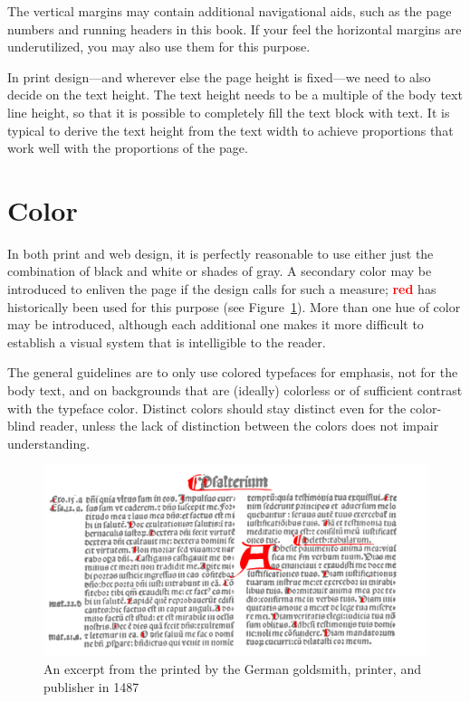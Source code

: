 The vertical margins may contain additional navigational aids, such as the page
numbers and running headers in this book. If your feel the horizontal margins
are underutilized, you may also use them for this
purpose.~\cite[sec.\,8.5.2]{bringhurst92}

In print design---and wherever else the page height is fixed---we need to also
decide on the text height. The text height needs to be a multiple of the body
text line height, so that it is possible to completely fill the text block with
text.  It is typical to derive the text height from the text width to achieve
proportions that work well with the proportions of the
page.~\cite[sec.\,8.4.2]{bringhurst92}

\section{Color}
In both print and web design, it is perfectly reasonable to use either just the
combination of black and white or shades of gray. A secondary color may be
introduced to enliven the page if the design calls for such a measure;
\textcolor{red}{\textbf{red}} has historically been used for this purpose (see
Figure~\ref{fig:vulgate-bible}).  More than one hue of color may be introduced,
although each additional one makes it more difficult to establish a visual
system that is intelligible to the reader.

The general guidelines are to only use colored typefaces for emphasis, not for
the body text, and on backgrounds that are (ideally) colorless or of sufficient
contrast with the typeface color. Distinct colors should stay distinct even for
the color-blind reader, unless the lack of distinction between the colors does
not impair understanding.

\begin{figure}
  \includegraphics[width=\textwidth]{examples/03/1500-latin-vulgate}
  \caption{An excerpt from the  printed by
    the German goldsmith, printer, and publisher  in
    1487}
  \label{fig:vulgate-bible}
\end{figure}
